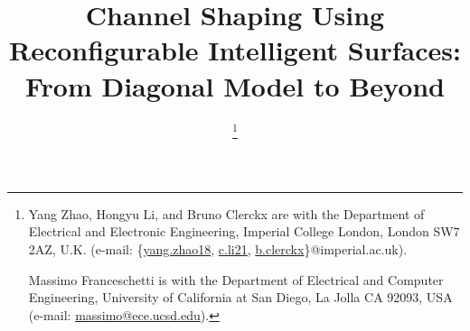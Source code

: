 \documentclass[journal]{IEEEtran}
\begin{document}
\title{Channel Shaping Using Reconfigurable Intelligent Surfaces: From Diagonal Model to Beyond}
\author{
	\thanks{
		Yang Zhao, Hongyu Li, and Bruno Clerckx are with the Department of Electrical and Electronic Engineering, Imperial College London, London SW7 2AZ, U.K. (e-mail: \{\href{mailto:yang.zhao18@imperial.ac.uk}{yang.zhao18}, \href{mailto:c.li21@imperial.ac.uk}{c.li21}, \href{mailto:b.clerckx@imperial.ac.uk}{b.clerckx}\}@imperial.ac.uk).

		Massimo Franceschetti is with the Department of Electrical and Computer Engineering, University of California at San Diego, La Jolla CA 92093, USA (e-mail: \href{mailto:massimo@ece.ucsd.edu}{massimo@ece.ucsd.edu}).
	}
}
\maketitle
\end{document}
